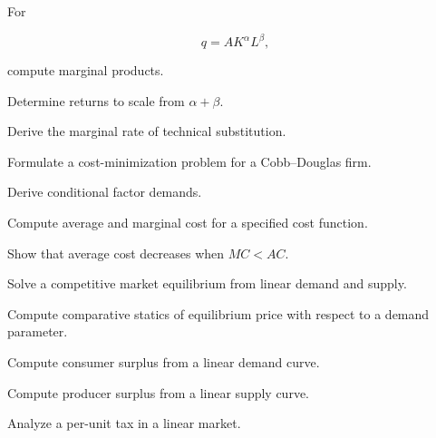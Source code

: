 \begin{exercise}[2]
For

\[
q=AK^\alpha L^\beta,
\]

compute marginal products.
\end{exercise}

\begin{exercise}[2]
Determine returns to scale from \(\alpha+\beta\).
\end{exercise}

\begin{exercise}[3]
Derive the marginal rate of technical substitution.
\end{exercise}

\begin{exercise}[3]
Formulate a cost-minimization problem for a Cobb--Douglas firm.
\end{exercise}

\begin{exercise}[3]
Derive conditional factor demands.
\end{exercise}

\begin{exercise}[2]
Compute average and marginal cost for a specified cost function.
\end{exercise}

\begin{exercise}[3]
Show that average cost decreases when \(MC<AC\).
\end{exercise}

\begin{exercise}[2]
Solve a competitive market equilibrium from linear demand and supply.
\end{exercise}

\begin{exercise}[3]
Compute comparative statics of equilibrium price with respect to a demand
parameter.
\end{exercise}

\begin{exercise}[2]
Compute consumer surplus from a linear demand curve.
\end{exercise}

\begin{exercise}[2]
Compute producer surplus from a linear supply curve.
\end{exercise}

\begin{exercise}[3]
Analyze a per-unit tax in a linear market.
\end{exercise}

